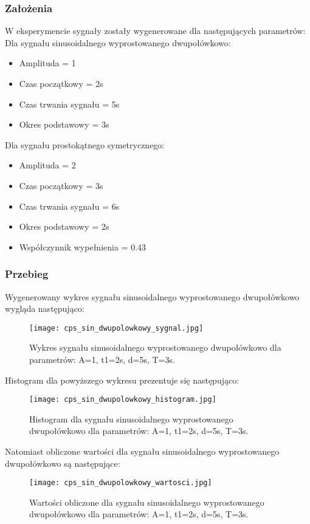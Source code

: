 \documentclass[12pt]{article}
\begin{document}
\subsubsection{Założenia}
W eksperymencie sygnały zostały wygenerowane dla następujących parametrów:
\\
Dla sygnału sinusoidalnego wyprostowanego dwupołówkowo:
\begin{itemize}
    \item Amplituda = 1
    \item Czas początkowy = 2s
    \item Czas trwania sygnału = 5s
    \item Okres podstawowy = 3s
\end{itemize}
Dla sygnału prostokątnego symetrycznego:
\begin{itemize}
    \item Amplituda = 2
    \item Czas początkowy = 3s
    \item Czas trwania sygnału = 6s
    \item Okres podstawowy = 2s
    \item Współczynnik wypełnienia = 0.43
\end{itemize}
\subsubsection{Przebieg}
Wygenerowany wykres sygnału sinusoidalnego wyprostowanego dwupołówkowo wygląda następująco:
\begin{figure}[H]
    \centering
    \texttt{[image: cps\_sin\_dwupolowkowy\_sygnal.jpg]}
    \caption{Wykres sygnału sinusoidalnego wyprostowanego dwupołówkowo dla parametrów:  A=1, t1=2s, d=5s, T=3s.}
    \label{Wykres dla sygnału sinusoidalnego dwupołówkowego}
\end{figure}

Histogram dla powyższego wykresu prezentuje się następująco:
\begin{figure}[H]
    \centering
    \texttt{[image: cps\_sin\_dwupolowkowy\_histogram.jpg]}
    \caption{Histogram dla sygnału sinusoidalnego wyprostowanego dwupołówkowo dla parametrów:  A=1, t1=2s, d=5s, T=3s.}
    \label{Histogram dla sygnału sinusoidalnego dwupołówkowego}
\end{figure}

Natomiast obliczone wartości dla sygnału sinusoidalnego wyprostowanego dwupołówkowo są następujące:
\begin{figure}[H]
    \centering
    \texttt{[image: cps\_sin\_dwupolowkowy\_wartosci.jpg]}
    \caption{Wartości obliczone dla sygnału sinusoidalnego wyprostowanego dwupołówkowo dla parametrów:  A=1, t1=2s, d=5s, T=3s.}
    \label{Wartości dla sygnału sinusoidalnego dwupołówkowego}
\end{figure}
\end{document}
